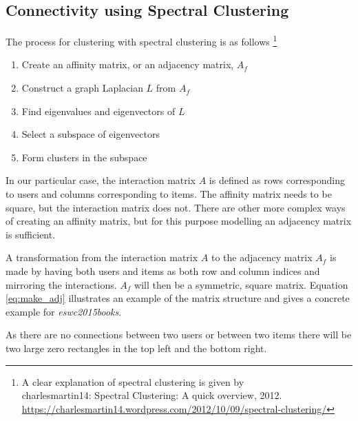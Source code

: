 
\subsection{Connectivity using Spectral Clustering}

The process for clustering with spectral clustering is as follows
\footnote{A clear explanation of spectral clustering is given by \\
charlesmartin14: Spectral Clustering: A quick overview, 2012. \\
\url{https://charlesmartin14.wordpress.com/2012/10/09/spectral-clustering/}}

\begin{enumerate}
    \item Create an affinity matrix, or an adjacency matrix, $A_f$
    \item Construct a graph Laplacian $L$ from $A_f$
    \item Find eigenvalues and eigenvectors of $L$
    \item Select a subspace of eigenvectors
    \item Form clusters in the subspace
\end{enumerate}

In our particular case, the interaction matrix $A$ is defined as rows corresponding to users and columns corresponding to items. The affinity matrix needs to be square, but the interaction matrix does not. There are other more complex ways of creating an affinity matrix, but for this purpose modelling an adjacency matrix is sufficient.

A transformation from the interaction matrix $A$ to the adjacency matrix $A_{f}$ is made by having both users and items as both row and column indices and mirroring the interactions. $A_{f}$ will then be a symmetric, square matrix. Equation \eqref{eq:make_adj} illustrates an example of the matrix structure and  gives a concrete example for \textit{eswc2015books}.

As there are no connections between two users or between two items there will be two large zero rectangles in the top left and the bottom right.

